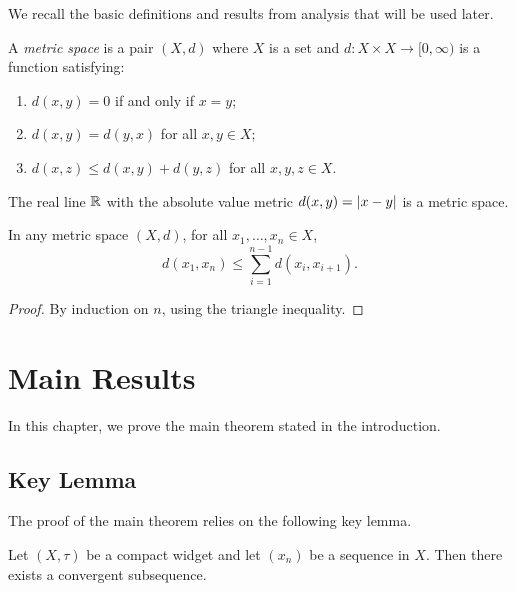 \documentclass[letterpaper,12pt,oneside,openany]{memoir}
\begin{document}
We recall the basic definitions and results from analysis that will be used later.

\begin{definition}\label{def:metric-space}
  A \emph{metric space} is a pair $(X, d)$ where $X$ is a set and
  $d \colon X \times X \to [0, \infty)$ is a function satisfying:
  \begin{enumerate}
  \item
    $d(x, y) = 0$ if and only if $x = y$;
  \item
    $d(x, y) = d(y, x)$ for all $x, y \in X$;
  \item
    $d(x, z) \le d(x, y) + d(y, z)$ for all $x, y, z \in X$.
  \end{enumerate}
\end{definition}

\begin{example}\label{exa:euclidean-metric}
  The real line $\mathbb{R}$ with the absolute value metric $d(x, y) = \lvert x - y\rvert$
  is a metric space.
\end{example}

\begin{lemma}\label{lem:triangle-inequality}
  In any metric space $(X, d)$, for all $x_1, \ldots, x_n \in X$,
  \begin{equation}\label{eq:generalized-triangle}
  d(x_1, x_n) \le \sum_{i=1}^{n-1} d(x_i, x_{i+1}).
  \end{equation}
\end{lemma}

\begin{proof}
  By induction on $n$, using the triangle inequality.
\end{proof}
\chapter{Main Results}\label{cha:main-results}

In this chapter, we prove the main theorem stated in the introduction.

\section{Key Lemma}\label{sec:key-lemma}

The proof of the main theorem relies on the following key lemma.

\begin{lemma}\label{lem:key-lemma}
  Let $(X, \tau)$ be a compact widget and let $(x_n)$ be a sequence in $X$.
  Then there exists a convergent subsequence.
\end{lemma}
\end{document}
